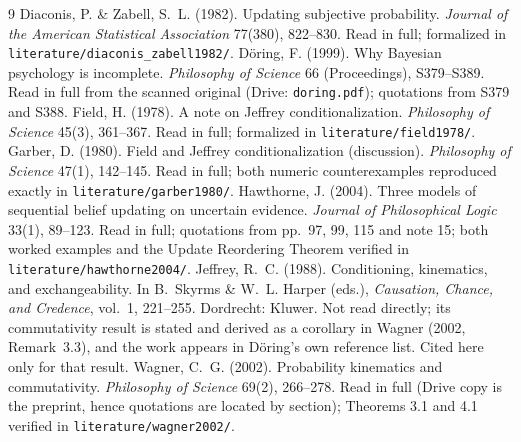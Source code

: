 \documentclass[11pt,a4paper]{article}
\begin{document}
\bigskip

\begin{thebibliography}{9}
Diaconis, P. \& Zabell,
  S.~L. (1982). Updating subjective probability. \emph{Journal of the American
  Statistical Association} 77(380), 822--830. Read in full; formalized in
  \texttt{literature/diaconis\_zabell1982/}.
D\"oring, F. (1999). Why Bayesian psychology
  is incomplete. \emph{Philosophy of Science} 66 (Proceedings), S379--S389.
  Read in full from the scanned original (Drive: \texttt{doring.pdf}); quotations
  from S379 and S388.
Field, H. (1978). A note on Jeffrey
  conditionalization. \emph{Philosophy of Science} 45(3), 361--367. Read in
  full; formalized in \texttt{literature/field1978/}.
Garber, D. (1980). Field and Jeffrey
  conditionalization (discussion). \emph{Philosophy of Science} 47(1), 142--145.
  Read in full; both numeric counterexamples reproduced exactly in
  \texttt{literature/garber1980/}.
Hawthorne, J. (2004). Three models of
  sequential belief updating on uncertain evidence. \emph{Journal of
  Philosophical Logic} 33(1), 89--123. Read in full; quotations from pp.~97, 99,
  115 and note 15; both worked examples and the Update Reordering Theorem
  verified in \texttt{literature/hawthorne2004/}.
Jeffrey, R.~C. (1988). Conditioning,
  kinematics, and exchangeability. In B.~Skyrms \& W.~L. Harper (eds.),
  \emph{Causation, Chance, and Credence}, vol.~1, 221--255. Dordrecht: Kluwer.
  Not read directly; its commutativity result is stated and derived as a
  corollary in Wagner (2002, Remark~3.3), and the work appears in D\"oring's
  own reference list. Cited here only for that result.
Wagner, C.~G. (2002). Probability kinematics
  and commutativity. \emph{Philosophy of Science} 69(2), 266--278. Read in full
  (Drive copy is the preprint, hence quotations are located by section);
  Theorems 3.1 and 4.1 verified in \texttt{literature/wagner2002/}.
\end{thebibliography}
\end{document}
